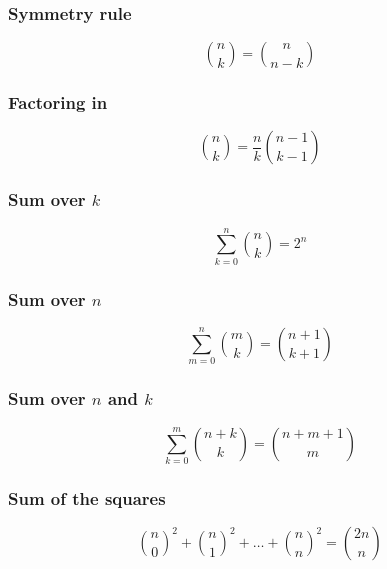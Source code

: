 \documentclass[10pt]{article}
\begin{document}
\subsubsection{Symmetry rule}

\begin{displaymath}
\binom{n}{k} = \binom{n}{n - k}
\end{displaymath}

\subsubsection{Factoring in}

\begin{displaymath}
\binom{n}{k} = \frac{n}{k} \binom{n - 1}{k - 1}
\end{displaymath}

\subsubsection{Sum over $k$}

\begin{displaymath}
\sum_{k = 0}^{n} \binom{n}{k} = 2^n
\end{displaymath}

\subsubsection{Sum over $n$}

\begin{displaymath}
\sum_{m = 0}^{n} \binom{m}{k} = \binom{n + 1}{k + 1}
\end{displaymath}

\subsubsection{Sum over $n$ and $k$}

\begin{displaymath}
\sum_{k = 0}^{m} \binom{n + k}{k} = \binom{n + m + 1}{m}
\end{displaymath}

\subsubsection{Sum of the squares}

\begin{displaymath}
\binom{n}{0}^{2} + \binom{n}{1}^{2} + \dots + \binom{n}{n}^{2} = \binom{2n}{n}
\end{displaymath}
\end{document}
